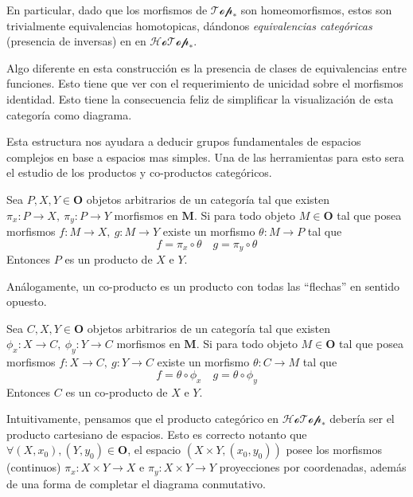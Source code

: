 En particular, dado que los morfismos de  \(\mathscr{Top}_*\) son
homeomorfismos, estos son trivialmente equivalencias homotopicas,
dándonos \emph{equivalencias categóricas} (presencia de inversas) en
en  \(\mathscr{HoTop}_*\).

Algo diferente en esta construcción es la presencia de clases de
equivalencias entre funciones. Esto tiene que ver con el requerimiento
de unicidad sobre el morfismos identidad. Esto tiene la consecuencia
feliz de simplificar la visualización de esta categoría como diagrama.

Esta estructura nos ayudara a deducir grupos fundamentales de espacios
complejos en base a espacios mas simples. Una de las herramientas para
esto sera el estudio de los productos y co-productos categóricos.

\begin{definicion}
  Sea \(P , X , Y \in \mathbf O\) objetos arbitrarios de un categoría
  tal que existen \(\pi_x : P \to X,\ \pi_y : P \to Y\) morfismos en
  \(\mathbf M\). Si para todo objeto \(M \in \mathbf O\) tal que posea
  morfismos \( f : M \to X,\ g : M \to Y\) existe un morfismo \(\theta :
  M \to P\) tal que
  \[ f = \pi_x \circ \theta \quad g = \pi_y \circ \theta \]
  Entonces \(P\) es un producto de \(X\) e \(Y\).
\end{definicion}
Análogamente, un co-producto es un producto con todas las ``flechas'' en
sentido opuesto.
\begin{definicion}
  Sea \(C , X , Y \in \mathbf O\) objetos arbitrarios de un categoría
  tal que existen \(\phi_x : X \to C,\ \phi_y : Y \to C\) morfismos en
  \(\mathbf M\). Si para todo objeto \(M \in \mathbf O\) tal que posea
  morfismos \( f : X \to C,\ g : Y \to C\) existe un morfismo \(\theta :
  C \to M\) tal que
  \[ f = \theta \circ \phi_x \quad g = \theta \circ \phi_y \]
  Entonces \(C\) es un co-producto de \(X\) e \(Y\).
\end{definicion}
Intuitivamente, pensamos que el producto categórico en
\(\mathscr{HoTop}_*\) debería ser el producto cartesiano de espacios.
Esto es correcto notanto que \(\forall (X,x_0) , (Y, y_0) \in \mathbf O
\), el espacio \((X \times Y, (x_0, y_0))\) posee los morfismos
(continuos) \(\pi_x : X \times Y \to X \) e \(\pi_y : X \times Y \to Y
\) proyecciones por coordenadas, además de una forma de completar el
diagrama conmutativo.


